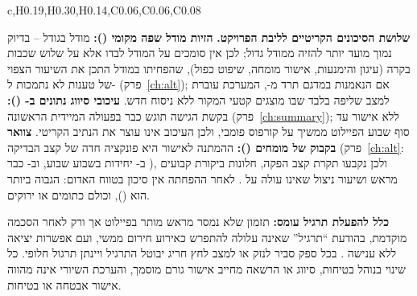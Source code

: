 \begin{table}[!htbp]
\begin{pctable}{c,H{0.19},H{0.30},H{0.14},C{0.06},C{0.06},C{0.08}}
\end{pctable}
\end{table}
\textbf{שלושת הסיכונים הקריטיים לליבת הפרויקט.} \textbf{הזיות מודל שפה מקומי ():} מודל בגודל -- בדיוק נמוך מועד יותר להזיה
ממודל גדול; לכן אין סומכים על המודל לבדו אלא על שלוש שכבות בקרה (עיגון והימנעות, אישור מומחה, שיפוט כפול), שהפחיתו במודל התכן את השיעור
הצפוי של טענות לא נתמכות ל- (פרק~\ref{ch:alt}); אם הנאמנות במדגם תרד מ-, המערכת עוברת למצב שליפה בלבד שבו מוצגים קטעי המקור ללא ניסוח חדש.
\textbf{עיכובי סיווג נתונים ב- ():} בקשת הגישה תוגש כבר בפעולה המיידית הראשונה (פרק~\ref{ch:summary}); ללא אישור עד סוף שבוע  הפיילוט
ממשיך על קורפוס  פומבי, ולכן העיכוב אינו עוצר את הנתיב הקריטי. \textbf{צוואר בקבוק של מומחים ():} ההמתנה לאישור היא פונקציה חדה
של קצב הבדיקה (פרק~\ref{ch:alt}: ב- יחידות בשבוע  שבוע, וב- כבר ), ולכן נקבעו תקרת קצב הפקה, חלונות ביקורת קבועים מראש ושיעור
ניצול \mth{\rho} שאינו עולה על . לאחר ההפחתה אין סיכון בטווח האדום: הגבוה ביותר הוא  (), וכולם כתומים או ירוקים.

\textbf{כלל להפעלת תרגיל עומס:} תזמון שלא נמסר מראש מותר בפיילוט אך ורק לאחר הסכמה מוקדמת, בהודעת “תרגיל” שאינה עלולה
להתפרש כאירוע חירום ממשי, ועם אפשרות יציאה ללא ענישה \cite{nist80084}. בכל ספק סביר לנזק או למצב לחץ חריג יבוטל התרגיל
ויינתן תרגול חלופי. כל שינוי בנוהל בטיחות, סיווג או הרשאה מחייב אישור גורם מוסמך, והערכת השיורי אינה מהווה אישור אבטחה או
בטיחות.
